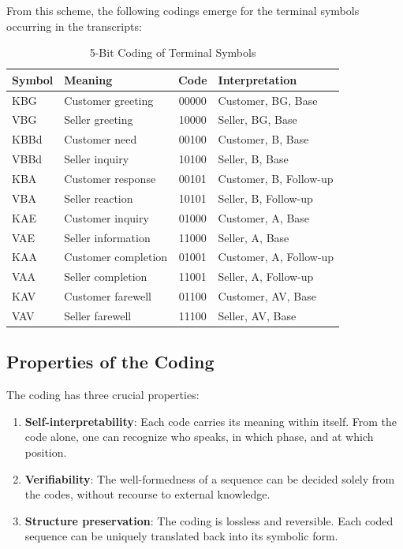 \documentclass[
  12pt,
  a4paper,
  oneside,
  titlepage
]{article}
\begin{document}
From this scheme, the following codings emerge for the terminal symbols occurring 
in the transcripts:

\begin{table}[h]
\centering
\caption{5-Bit Coding of Terminal Symbols}
\label{tab:coding}
\begin{tabular}{@{} l l c l @{}}
\toprule
\textbf{Symbol} & \textbf{Meaning} & \textbf{Code} & \textbf{Interpretation} \\
\midrule
KBG & Customer greeting & 00000 & Customer, BG, Base \\
VBG & Seller greeting & 10000 & Seller, BG, Base \\
KBBd & Customer need & 00100 & Customer, B, Base \\
VBBd & Seller inquiry & 10100 & Seller, B, Base \\
KBA & Customer response & 00101 & Customer, B, Follow-up \\
VBA & Seller reaction & 10101 & Seller, B, Follow-up \\
KAE & Customer inquiry & 01000 & Customer, A, Base \\
VAE & Seller information & 11000 & Seller, A, Base \\
KAA & Customer completion & 01001 & Customer, A, Follow-up \\
VAA & Seller completion & 11001 & Seller, A, Follow-up \\
KAV & Customer farewell & 01100 & Customer, AV, Base \\
VAV & Seller farewell & 11100 & Seller, AV, Base \\
\bottomrule
\end{tabular}
\end{table}

\subsection{Properties of the Coding}

The coding has three crucial properties:

\begin{enumerate}
    \item \textbf{Self-interpretability}: Each code carries its meaning within 
    itself. From the code alone, one can recognize who speaks, in which phase, 
    and at which position.
    
    \item \textbf{Verifiability}: The well-formedness of a sequence can be 
    decided solely from the codes, without recourse to external knowledge.
    
    \item \textbf{Structure preservation}: The coding is lossless and reversible. 
    Each coded sequence can be uniquely translated back into its symbolic form.
\end{enumerate}
\end{document}

